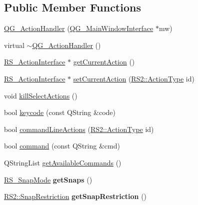 \subsection*{Public Member Functions}
\begin{DoxyCompactItemize}
\item 
\hyperlink{classQG__ActionHandler_a27c7d933cd1dc41584afd7f7c0a61e52}{Q\-G\-\_\-\-Action\-Handler} (\hyperlink{classQG__MainWindowInterface}{Q\-G\-\_\-\-Main\-Window\-Interface} $\ast$mw)
\item 
virtual \hyperlink{classQG__ActionHandler_a8e73503cca33185c53d7a2d619795fd7}{$\sim$\-Q\-G\-\_\-\-Action\-Handler} ()
\item 
\hyperlink{classRS__ActionInterface}{R\-S\-\_\-\-Action\-Interface} $\ast$ \hyperlink{classQG__ActionHandler_a64d373bcb2c316b918105b5f2a7f0dec}{get\-Current\-Action} ()
\item 
\hyperlink{classRS__ActionInterface}{R\-S\-\_\-\-Action\-Interface} $\ast$ \hyperlink{classQG__ActionHandler_afd06b74bf5b9c16f9d16c69b547eec14}{set\-Current\-Action} (\hyperlink{classRS2_afe3523e0bc41fd637b892321cfc4b9d7}{R\-S2\-::\-Action\-Type} id)
\item 
void \hyperlink{classQG__ActionHandler_a64fd6709991199be596ed0acb5799f5b}{kill\-Select\-Actions} ()
\item 
bool \hyperlink{classQG__ActionHandler_a632120ecad96b5baad83a59a139229c9}{keycode} (const Q\-String \&code)
\item 
bool \hyperlink{classQG__ActionHandler_a3414bd3b53f78277d5cb1078a9e6b05f}{command\-Line\-Actions} (\hyperlink{classRS2_afe3523e0bc41fd637b892321cfc4b9d7}{R\-S2\-::\-Action\-Type} id)
\item 
bool \hyperlink{classQG__ActionHandler_a7626a5b8e1ff3dd6c4a9744ae24c559a}{command} (const Q\-String \&cmd)
\item 
Q\-String\-List \hyperlink{classQG__ActionHandler_a1f8dda754681b2da773f5c9100a0cfc2}{get\-Available\-Commands} ()
\item 
\hypertarget{classQG__ActionHandler_aa5d9acfec74fda11c4d362007c02f744}{\hyperlink{structRS__SnapMode}{R\-S\-\_\-\-Snap\-Mode} {\bfseries get\-Snaps} ()}\label{classQG__ActionHandler_aa5d9acfec74fda11c4d362007c02f744}

\item 
\hypertarget{classQG__ActionHandler_a4ae2e9b90b3d503d241765f6373107db}{\hyperlink{classRS2_aac67b6890a08cff619c0fbef48377bae}{R\-S2\-::\-Snap\-Restriction} {\bfseries get\-Snap\-Restriction} ()}\label{classQG__ActionHandler_a4ae2e9b90b3d503d241765f6373107db}

\end{DoxyCompactItemize}



